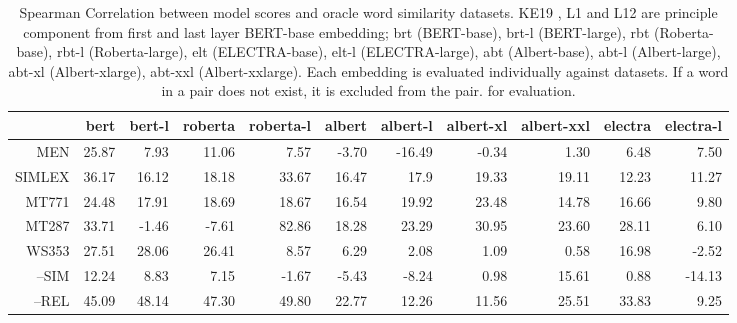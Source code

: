 \documentclass[letterpaper]{article} %
\begin{document}
\begin{table}[!]
\centering
\begin{tabular}{r|rr|rr|rrrr|rr}
 & bert & bert-l & roberta & roberta-l &albert &albert-l &albert-xl & albert-xxl & electra & electra-l\\
 \hline

MEN & 25.87 & 7.93 & 11.06 & 7.57 & -3.70 & -16.49 &-0.34& 1.30 & 6.48& 7.50\\
SIMLEX & 36.17 & 16.12 & 18.18 & 33.67 & 16.47 & 17.9 & 19.33 & 19.11 &12.23& 11.27\\
MT771  & 24.48 & 17.91 & 18.69 & 18.67 & 16.54 & 19.92 &23.48 &14.78& 16.66 & 9.80\\
MT287  &33.71& -1.46 & -7.61 & 82.86 & 18.28 & 23.29 &30.95 & 23.60& 28.11 & 6.10\\
WS353  &27.51 &28.06 &26.41 & 8.57 & 6.29 & 2.08 &1.09 & 0.58& 16.98& -2.52\\
--SIM &12.24 & 8.83 & 7.15 & -1.67 & -5.43 & -8.24 &0.98 & 15.61& 0.88& -14.13\\
--REL &45.09 & 48.14 & 47.30 & 49.80 & 22.77 & 12.26 &11.56& 25.51& 33.83 & 9.25\\
\end{tabular}
\caption{Spearman Correlation between model scores and oracle word similarity datasets. KE19 \cite{Ethayarajh2019HowCA}, L1 and L12 are principle component from first and last layer BERT-base embedding; brt (BERT-base), brt-l (BERT-large), rbt (Roberta-base), rbt-l (Roberta-large), elt (ELECTRA-base), elt-l (ELECTRA-large), abt (Albert-base), abt-l (Albert-large), abt-xl (Albert-xlarge), abt-xxl (Albert-xxlarge). Each embedding is evaluated individually against datasets. If a word in a pair does not exist, it is excluded from the pair. for evaluation.}
\label{tab:6}
\end{table}
\end{document}
